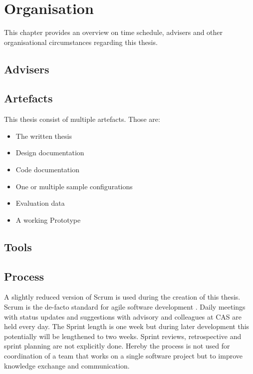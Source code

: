 \chapter{Organisation}
\label{ch:Organisation}

This chapter provides an overview on time schedule, advisers and other organisational circumstances regarding this thesis.

\section{Advisers}
\label{sec:Organisation:Advisers}

\section{Artefacts}
\label{sec:Organisation:Artefacts}

This thesis consist of multiple artefacts. Those are:
\begin{itemize}
    \item The written thesis
    \item Design documentation
    \item Code documentation
    \item One or multiple sample configurations
    \item Evaluation data
    \item A working Prototype
\end{itemize}

\section{Tools}
\label{sec:Organisation:Tools}

\section{Process}
\label{sec:Organisation:Process}

A slightly reduced version of Scrum is used during the creation of this thesis. Scrum is the de-facto standard for agile software development \cite{glogerScrumPradigmenwechselIm2010}. Daily meetings with status updates and suggestions with advisory and colleagues at CAS are held every day. The Sprint length is one week but during later development this potentially will be lengthened to two weeks. Sprint reviews, retrospective and sprint planning are not explicitly done. Hereby the process is not used for coordination of a team that works on a single software project but to improve knowledge exchange and communication.

